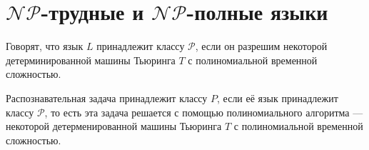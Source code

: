 \section{$\mathscr{NP}$-трудные и $\mathscr{NP}$-полные языки}
\dftion Говорят, что язык $L$ принадлежит классу $\mathscr{P}$, если он разрешим некоторой детерминированной машины Тьюринга $T$ с полиномиальной временной сложностью.

\dftion Распознавательная задача принадлежит классу $P$, если её язык принадлежит классу $\mathscr{P}$, то есть эта задача решается с помощью полиномиального алгоритма --- некоторой детерменированной машины Тьюринга $T$ с полиномиальной временной сложностью.